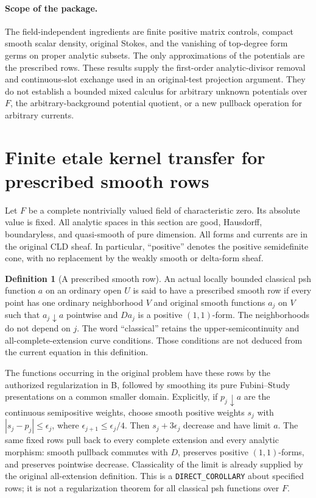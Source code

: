 \documentclass[11pt,a4paper]{article}
\numberwithin{equation}{section}
\theoremstyle{definition}
\newtheorem{definition}[theorem]{Definition}
\theoremstyle{remark}
\begin{document}
\paragraph{Scope of the package.}
The field-independent ingredients are finite positive matrix
controls, compact smooth scalar density, original Stokes, and the
vanishing of top-degree form germs on proper analytic subsets.
The only approximations of the potentials are the prescribed rows.
These results supply the first-order analytic-divisor removal and
continuous-slot exchange used in an original-test projection
argument.  They do not establish a bounded mixed calculus for
arbitrary unknown potentials over $F$, the arbitrary-background
potential quotient, or a new pullback operation for arbitrary
currents.



\section{Finite etale kernel transfer for prescribed smooth rows}
\label{sec:r5-prescribed-finite-etale}

Let $F$ be a complete nontrivially valued field of characteristic zero.
Its absolute value is fixed. All analytic spaces in this section are
good, Hausdorff, boundaryless, and quasi-smooth of pure dimension.
All forms and currents are in the original CLD sheaf. In particular,
``positive'' denotes the positive semidefinite cone, with no
replacement by the weakly smooth or delta-form sheaf.

\begin{definition}[A prescribed smooth row]
\label{def:r5-prescribed-row}
An actual locally bounded classical psh function $a$ on an ordinary
open $U$ is said to have a prescribed smooth row if every point has
one ordinary neighborhood $V$ and original smooth functions $a_j$
on $V$ such that $a_j\downarrow a$ pointwise and $Da_j$ is a positive
$(1,1)$-form. The neighborhoods do not depend on $j$.
The word ``classical'' retains the upper-semicontinuity and
all-complete-extension curve conditions. Those conditions are not
deduced from the current equation in this definition.
\end{definition}

The functions occurring in the original problem have these rows by
the authorized regularization in B, followed by smoothing its pure
Fubini--Study presentations on a common smaller domain. Explicitly,
if $p_j\downarrow a$ are the continuous semipositive weights, choose
smooth positive weights $s_j$ with $|s_j-p_j|\leq\epsilon_j$,
where $\epsilon_{j+1}\leq\epsilon_j/4$. Then
$s_j+3\epsilon_j$ decrease and have limit $a$. The same fixed rows
pull back to every complete extension and every analytic morphism:
smooth pullback commutes with $D$, preserves positive $(1,1)$-forms,
and preserves pointwise decrease. Classicality of the limit is
already supplied by the original all-extension definition. This is
a \texttt{DIRECT\_COROLLARY} about specified rows; it is not a
regularization theorem for all classical psh functions over $F$.
\end{document}
